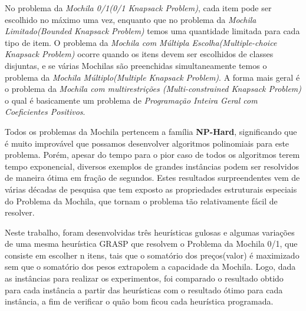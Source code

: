 \documentclass[a4paper, 12pt]{article}
\begin{document}
No problema da \textit{Mochila 0/1(0/1 Knapsack Problem)}, cada item pode ser escolhido no máximo uma vez, 
enquanto que no problema da \textit{Mochila Limitado(Bounded Knapsack Problem)} temos uma quantidade limitada 
para cada tipo de item. O problema da \textit{Mochila com Múltipla Escolha(Multiple-choice Knapsack Problem)}
ocorre quando os itens devem ser escolhidos de classes disjuntas, e se várias Mochilas são preenchidas 
simultaneamente temos o problema da \textit{Mochila Múltiplo(Multiple Knapsack Problem)}. 
A forma mais geral é o problema da \textit{Mochila com multirestrições (Multi-constrained Knapsack Problem)} 
o qual é basicamente um problema de \textit{Programação Inteira Geral com Coeficientes Positivos}.

Todos os problemas da Mochila pertencem a família \textbf{NP-Hard}\cite{pisinger1995algorithms}, significando que
é muito improvável que possamos desenvolver algoritmos polinomiais para este problema. Porém, apesar do tempo para o pior caso de todos os algoritmos terem tempo exponencial, diversos exemplos 
de grandes instâncias podem ser resolvidos de maneira ótima em fração de segundos. 
Estes resultados surpreendentes vem de várias décadas de pesquisa que tem exposto as propriedades 
estruturais especiais do Problema da Mochila, que tornam o problema tão relativamente fácil de resolver.

Neste trabalho, foram desenvolvidas três heurísticas gulosas e algumas variações de uma mesma heurística GRASP que resolvem 
o Problema da Mochila 0/1, que consiste em escolher n itens, tais que o somatório dos preços(valor) é maximizado sem 
que o somatório dos pesos extrapolem a capacidade da Mochila. Logo, dada as instâncias para realizar
os experimentos, foi comparado o resultado obtido para cada instância a partir das heurísticas com o resultado
ótimo para cada instância, a fim de verificar o quão bom ficou cada heurística programada.


\end{document}
